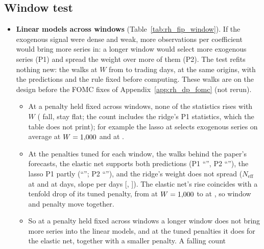 \subsection{Window test}
\label{app:rh_fi_window}
\begin{itemize}
\item \textbf{Linear models across windows} (Table~\ref{tab:rh_fip_window}). If the exogenous signal were dense and
  weak, more observations per coefficient would bring more series in: a longer window would select more exogenous
  series (P1) and spread the weight over more of them (P2). The test refits nothing new: the walks at $W$ from
  \rhfipWMin{} to \rhfipWMax{} trading days, at the same \rhfipNOrigins{} origins, with the predictions and the rule
  fixed before computing. These walks are on the design before the FOMC fixes of Appendix~\ref{app:rh_dp_fomc} (not
  rerun).
  \begin{itemize}
  \item At a penalty held fixed across windows, none of the \rhfipSOneMeasures{} statistics rises with $W$
    (\rhfipSOneFalls{} fall, \rhfipSOneFlat{} stay flat; the count includes the ridge's P1 statistics, which the
    table does not print); for example the lasso at \rhfipLassoSOneLo{} selects \rhfipLassoSOneVWMin{} exogenous
    series on average at $W = 1{,}000$ and \rhfipLassoSOneVWMax{} at \rhfipWMax.
  \item At the penalties tuned for each window, the walks behind the paper's forecasts, the elastic net supports
    both predictions (P1 ``\rhfipEnetPOneWalk'', P2 ``\rhfipEnetPTwoWalk''), the lasso P1 partly
    (``\rhfipLassoPOneWalk''; P2 ``\rhfipLassoPTwoWalk''), and the ridge's weight does not spread ($N_{\mathrm{eff}}$
    \rhfipRidgeNeffWMin{} at \rhfipWMin{} and \rhfipRidgeNeffWMax{} at \rhfipWMax{} days, slope \rhfipRidgeNeffSlope{}
    per \rhfipSlopeUnit{} days [\rhfipRidgeNeffSlopeLo, \rhfipRidgeNeffSlopeHi]). The elastic net's rise coincides
    with a tenfold drop of its tuned penalty, from \rhfipEnetPenWMin{} at $W = 1{,}000$ to \rhfipEnetPenWNext{} at
    \rhfipWNext, so window and penalty move together.
  \item So at a penalty held fixed across windows a longer window does not bring more series into the linear
    models, and at the tuned penalties it does for the elastic net, together with a smaller penalty. A falling count

\end{itemize}
\end{itemize}
